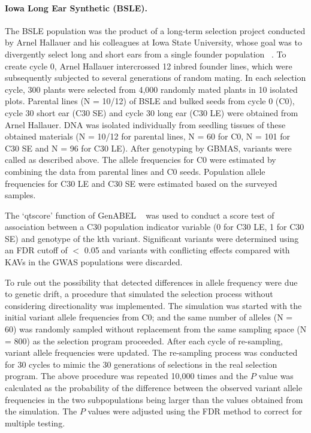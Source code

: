 \documentclass[10pt,letterpaper]{article}
\begin{document}
\paragraph{Iowa Long Ear Synthetic (BSLE).}
The BSLE population was the product of a long-term selection project conducted by Arnel Hallauer and his colleagues at Iowa State University, whose goal was to divergently select long and short ears from a single founder population ~\cite{Hallauer2004}. To create cycle 0, Arnel Hallauer intercrossed 12 inbred founder lines, which were subsequently subjected to several generations of random mating. In each selection cycle, 300 plants were selected from 4,000 randomly mated plants in 10 isolated plots. Parental lines (N = 10/12) of BSLE and bulked seeds from cycle 0 (C0), cycle 30 short ear (C30 SE) and cycle 30 long ear (C30 LE) were obtained from Arnel Hallauer. DNA was isolated individually from seedling tissues of these obtained materials (N = 10/12 for parental lines, N = 60 for C0, N = 101 for C30 SE and N = 96 for C30 LE). After genotyping by GBMAS, variants were called as described above. The allele frequencies for C0 were estimated by combining the data from parental lines and C0 seeds. Population allele frequencies for C30 LE and C30 SE were estimated based on the surveyed samples. 

The ‘qtscore’ function of GenABEL ~\cite{Aulchenko2007} was used to conduct a score test of association between a C30 population indicator variable (0 for C30 LE, 1 for C30 SE) and genotype of the kth variant. Significant variants were determined using an FDR cutoff of $<$ 0.05 and variants with conflicting effects compared with KAVs in the GWAS populations were discarded.

To rule out the possibility that detected differences in allele frequency were due to genetic drift, a procedure that simulated the selection process without considering directionality was implemented. The simulation was started with the initial variant allele frequencies from C0; and the same number of alleles (N = 60) was randomly sampled without replacement from the same sampling space (N = 800) as the selection program proceeded. After each cycle of re-sampling, variant allele frequencies were updated. The re-sampling process was conducted for 30 cycles to mimic the 30 generations of selections in the real selection program. The above procedure was repeated 10,000 times and the $P$ value was calculated as the probability of the difference between the observed variant allele frequencies in the two subpopulations being larger than the values obtained from the simulation. The $P$ values were adjusted using the FDR method to correct for multiple testing. 
\end{document}
